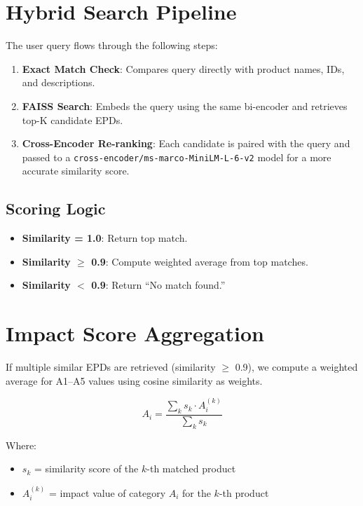 \documentclass[11pt]{article}
\begin{document}
\section{Hybrid Search Pipeline}
The user query flows through the following steps:

\begin{enumerate}
    \item \textbf{Exact Match Check}: Compares query directly with product names, IDs, and descriptions.
    \item \textbf{FAISS Search}: Embeds the query using the same bi-encoder and retrieves top-K candidate EPDs.
    \item \textbf{Cross-Encoder Re-ranking}: Each candidate is paired with the query and passed to a \texttt{cross-encoder/ms-marco-MiniLM-L-6-v2} model for a more accurate similarity score.
\end{enumerate}

\subsection*{Scoring Logic}
\begin{itemize}
    \item \textbf{Similarity = 1.0}: Return top match.
    \item \textbf{Similarity $\geq$ 0.9}: Compute weighted average from top matches.
    \item \textbf{Similarity $<$ 0.9}: Return ``No match found.''
\end{itemize}

\section{Impact Score Aggregation}
If multiple similar EPDs are retrieved (similarity $\geq$ 0.9), we compute a weighted average for A1–A5 values using cosine similarity as weights.

\begin{equation}
A_i = \frac{\sum_{k} s_k \cdot A_{i}^{(k)}}{\sum_{k} s_k}
\end{equation}

Where:
\begin{itemize}
    \item $s_k$ = similarity score of the $k$-th matched product
    \item $A_{i}^{(k)}$ = impact value of category $A_i$ for the $k$-th product
\end{itemize}
\end{document}
